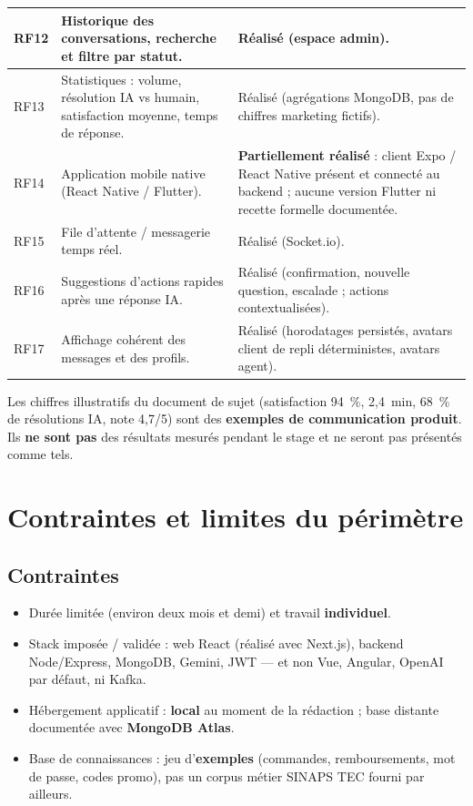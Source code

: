 \begin{longtable}{|p{1.2cm}|p{9.4cm}|p{5.3cm}|}
\hline
RF12 & Historique des conversations, recherche et filtre par statut. & Réalisé (espace admin). \\
\hline
RF13 & Statistiques : volume, résolution IA vs humain, satisfaction moyenne, temps de réponse. & Réalisé (agrégations MongoDB, pas de chiffres marketing fictifs). \\
\hline
RF14 & Application mobile native (React Native / Flutter). & \textbf{Partiellement réalisé} : client Expo / React Native présent et connecté au backend ; aucune version Flutter ni recette formelle documentée. \\
\hline
RF15 & File d'attente / messagerie temps réel. & Réalisé (Socket.io). \\
\hline
RF16 & Suggestions d'actions rapides après une réponse IA. & Réalisé (confirmation, nouvelle question, escalade ; actions contextualisées). \\
\hline
RF17 & Affichage cohérent des messages et des profils. & Réalisé (horodatages persistés, avatars client de repli déterministes, avatars agent). \\
\hline
\end{longtable}
\normalsize

Les chiffres illustratifs du document de sujet (satisfaction 94~\%, 2,4~min, 68~\% de résolutions IA, note 4,7/5) sont des \textbf{exemples de communication produit}. Ils \textbf{ne sont pas} des résultats mesurés pendant le stage et ne seront pas présentés comme tels.

\section{Contraintes et limites du périmètre}

\subsection{Contraintes}

\begin{itemize}[leftmargin=1.4em]
  \item Durée limitée (environ deux mois et demi) et travail \textbf{individuel}.
  \item Stack imposée / validée : web React (réalisé avec Next.js), backend Node/Express, MongoDB, Gemini, JWT --- et non Vue, Angular, OpenAI par défaut, ni Kafka.
  \item Hébergement applicatif : \textbf{local} au moment de la rédaction ; base distante documentée avec \textbf{MongoDB Atlas}.
  \item Base de connaissances : jeu d'\textbf{exemples} (commandes, remboursements, mot de passe, codes promo), pas un corpus métier SINAPS TEC fourni par ailleurs.
\end{itemize}

